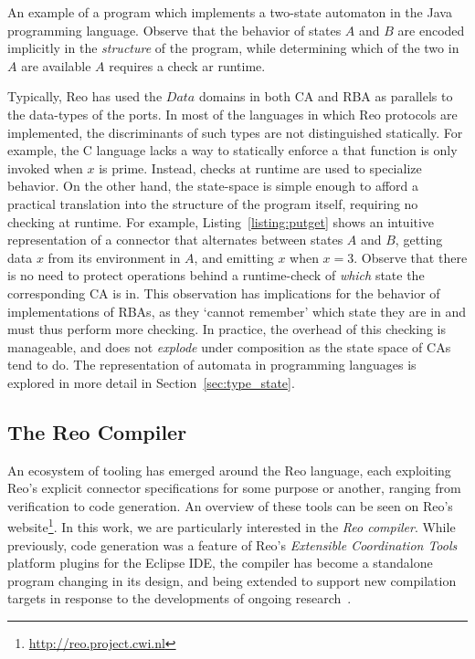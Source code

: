 \begin{listing}[ht]
	\inputminted[]{java}{putget.java}
	\caption[Type state automaton in Java.]{An example of a program which implements a two-state automaton in the Java programming language. Observe that the behavior of states $A$ and $B$ are encoded implicitly in the \textit{structure} of the program, while determining which of the two in $A$ are available $A$ requires a check ar runtime.}
	\label{listing:putget}
\end{listing}
Typically, Reo has used the $Data$ domains in both CA and RBA as parallels to the data-types of the ports. In most of the languages in which Reo protocols are implemented, the discriminants of such types are not distinguished statically. For example, the C language lacks a way to statically enforce a that function  is only invoked when $x$ is prime. Instead, checks at runtime are used to specialize behavior. On the other hand, the state-space is simple enough to afford a practical translation into the structure of the program itself, requiring no checking at runtime. For example, Listing~\ref{listing:putget} shows an intuitive representation of a connector that alternates between states $A$ and $B$, getting data $x$ from its environment in $A$, and emitting $x$ when $x=3$. Observe that there is no need to protect operations behind a runtime-check of \textit{which} state the corresponding CA is in. This observation has implications for the behavior of implementations of RBAs, as they `cannot remember' which state they are in and must thus perform more checking. In practice, the overhead of this checking is manageable, and does not \textit{explode} under composition as the state space of CAs tend to do. The representation of automata in programming languages is explored in more detail in Section~\ref{sec:type_state}.

\subsection{The Reo Compiler}
An ecosystem of tooling has emerged around the Reo language, each exploiting Reo's explicit connector specifications for some purpose or another, ranging from verification to code generation. An overview of these tools can be seen on Reo's  website\footnote{\url{http://reo.project.cwi.nl}}. In this work, we are particularly interested in the \textit{Reo compiler}. While previously, code generation was a feature of Reo's \textit{Extensible Coordination Tools} platform plugins for the Eclipse IDE, the compiler has become a standalone program changing in its design, and being extended to support new compilation targets in response to the developments of ongoing research~\cite{jongmans2012automatic, jongmans2015partially, dokter2018rule}.

